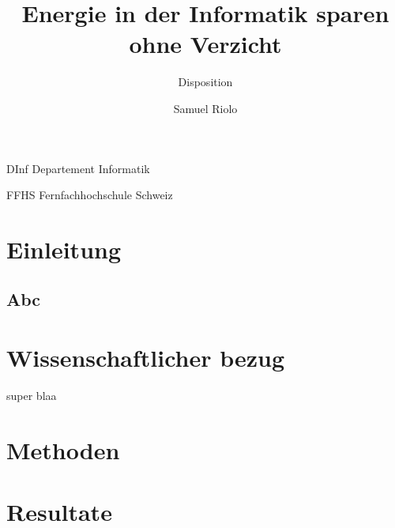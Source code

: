 \documentclass{../template/ffhsthesis}
\begin{document}
\title{Energie in der Informatik sparen ohne Verzicht}
\subtitle{Disposition} %
\author{Samuel Riolo}


\maketitle



\tableofcontents


\begin{abkuerzungen}[MUSTER] %
\item[DInf] Departement Informatik
\item[FFHS] Fernfachhochschule Schweiz
\end{abkuerzungen}


\startThesis %

\chapter{Einleitung}
\section{Abc}
 

\chapter{Wissenschaftlicher bezug}

super blaa


\chapter{Methoden}

\chapter{Resultate}
\cite[p. 2] {small}
\cite[p. 2] {test}
\cite[p. 2] {sam}




\end{document}
